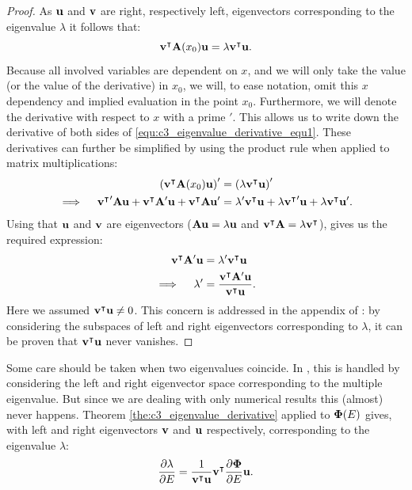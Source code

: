 \begin{proof}
  As $\vb{u}$ and $\vb{v}$ are right, respectively left, eigenvectors corresponding to the eigenvalue $\lambda$ it follows that:
  \begin{equation}\label{equ:c3_eigenvalue_derivative_equ1}
    {\vb{v}}^\intercal\vb{A}(x_0)\vb{u}  = \lambda {\vb{v}}^\intercal\vb{u}\text{.}
  \end{equation}
  Because all involved variables are dependent on $x$, and we will only take the value (or the value of the derivative) in $x_0$, we will, to ease notation, omit this $x$ dependency and implied evaluation in the point $x_0$. Furthermore, we will denote the derivative with respect to $x$ with a prime $'$. This allows us to write down the derivative of both sides of \eqref{equ:c3_eigenvalue_derivative_equ1}. These derivatives can further be simplified by using the product rule when applied to matrix multiplications:
  \begin{align*}
    \left({\vb{v}}^\intercal\vb{A}(x_0)\vb{u}\right)'                                                                    & = \left(\lambda {\vb{v}}^\intercal\vb{u}\right)'                                                                      \\
    \implies \quad {{\vb{v}}^\intercal}'\vb{A}\vb{u} + {\vb{v}}^\intercal\vb{A}'\vb{u} + {\vb{v}}^\intercal\vb{A}\vb{u}' & = \lambda' {\vb{v}}^\intercal\vb{u} + \lambda {{\vb{v}}^\intercal}'\vb{u} + \lambda {\vb{v}}^\intercal\vb{u}'\text{.}
  \end{align*}
  Using that $\vb{u}$ and $\vb{v}$ are eigenvectors ($\vb{A} \vb{u} = \lambda \vb{u}$ and ${\vb{v}}^\intercal\vb{A} = \lambda {\vb{v}}^\intercal$), gives us the required expression:
  \begin{align*}
    {\vb{v}}^\intercal\vb{A}'\vb{u} & = \lambda' {\vb{v}}^\intercal\vb{u}                                         \\
    \implies \quad \lambda'         & = \frac{{\vb{v}}^\intercal\vb{A}'\vb{u}}{{\vb{v}}^\intercal\vb{u}} \text{.}
  \end{align*}
  Here we assumed ${\vb{v}}^\intercal\vb{u} \neq 0$. This concern is addressed in the appendix of \cite{lancaster_eigenvalues_1964}: by considering the subspaces of left and right eigenvectors corresponding to $\lambda$, it can be proven that ${\vb{v}}^\intercal\vb{u}$ never vanishes.
\end{proof}

Some care should be taken when two eigenvalues coincide. In \cite{lancaster_eigenvalues_1964}, this is handled by considering the left and right eigenvector space corresponding to the multiple eigenvalue. But since we are dealing with only numerical results this (almost) never happens. Theorem \ref{the:c3_eigenvalue_derivative} applied to $\vb{\Phi}(E)$ gives, with left and right eigenvectors $\vb{v}$ and $\vb{u}$ respectively, corresponding to the eigenvalue $\lambda$:
$$
  \pdv{\lambda}{E} = \frac{1}{{\vb{v}}^\intercal\vb{u}}{\vb{v}}^\intercal \pdv{\vb{\Phi}}{E} \vb{u} \text{.}
$$

